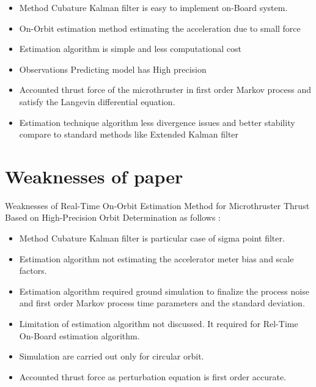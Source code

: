 \documentclass[conference]{IEEEtran}
\begin{document}
\begin{itemize}
\item Method Cubature Kalman filter is easy to implement on-Board system.
\item On-Orbit estimation method estimating the acceleration due to small force
\item Estimation algorithm is simple and less computational cost
\item Observations Predicting model has High precision 
\item Accounted thrust force  of the microthruster in first order Markov process and satisfy the Langevin differential equation.
\item Estimation technique algorithm less divergence issues and better stability compare to standard methods like Extended Kalman filter
           
 
\end{itemize}

\section{Weaknesses of paper \cite{yang2021real}}
Weaknesses of Real-Time On-Orbit Estimation Method for Microthruster Thrust Based on High-Precision Orbit Determination as follows :
\begin{itemize}
\item Method Cubature Kalman filter is particular case of sigma point filter.
\item Estimation algorithm not estimating the accelerator meter bias and scale factors. 
\item Estimation algorithm required ground simulation to finalize the process noise and first order Markov process time parameters and the standard deviation.
\item Limitation of estimation algorithm not discussed. It required for Rel-Time On-Board estimation algorithm. 
\item Simulation are carried out only for circular orbit.
\item Accounted thrust force as perturbation equation is first order accurate.  
\end{itemize}




\end{document}
